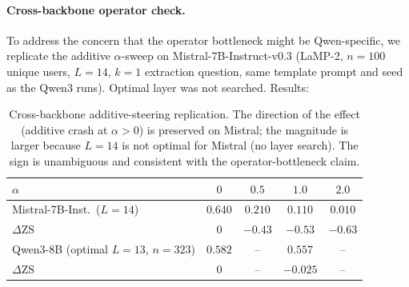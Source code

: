 \documentclass{article}
\begin{document}
\paragraph{Cross-backbone operator check.}  To address the concern
that the operator bottleneck might be Qwen-specific, we replicate
the additive $\alpha$-sweep on Mistral-7B-Instruct-v0.3 (LaMP-2,
$n{=}100$ unique users, $L{=}14$, $k{=}1$ extraction question, same
template prompt and seed as the Qwen3 runs).  Optimal layer was not
searched.  Results:
\begin{table}[h]
\centering\small
\begin{tabular}{lcccc}
\toprule
$\alpha$ & $0$ & $0.5$ & $1.0$ & $2.0$ \\
\midrule
Mistral-7B-Inst.\ ($L{=}14$) & $0.640$ & $0.210$ & $0.110$ & $0.010$ \\
$\Delta$ZS                  & $0$    & $-0.43$ & $-0.53$ & $-0.63$ \\
\midrule
Qwen3-8B (optimal $L{=}13$, $n{=}323$) & $0.582$ & -- & $0.557$ & -- \\
$\Delta$ZS                  & $0$    & --      & $-0.025$ & --     \\
\bottomrule
\end{tabular}
\caption{Cross-backbone additive-steering replication. The
direction of the effect (additive crash at $\alpha\!>\!0$) is
preserved on Mistral; the magnitude is larger because $L{=}14$
is not optimal for Mistral (no layer search). The sign is
unambiguous and consistent with the operator-bottleneck claim.}
\label{tab:mistral_xbackbone}
\end{table}
\end{document}
